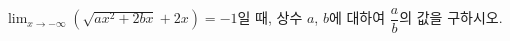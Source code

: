 $\displaystyle\lim_{x\to-\infty}(\sqrt{ax^2+2bx}+2x)=-1$일 때, 상수 $a$, $b$에 대하여 $\dfrac{a}{b}$의 값을 구하시오.
